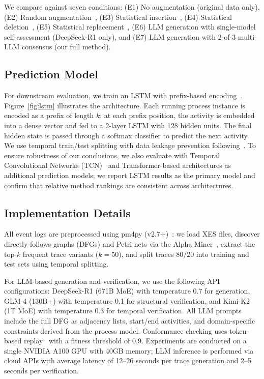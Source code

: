 \documentclass[11pt,a4paper]{article}
\begin{document}
We compare against seven conditions: (E1) No augmentation (original data only), (E2) Random augmentation~\cite{kappel2023modelagnostic}, (E3) Statistical insertion~\cite{vanstraten2025siamsa}, (E4) Statistical deletion~\cite{vanstraten2025siamsa}, (E5) Statistical replacement~\cite{vanstraten2025siamsa}, (E6) LLM generation with single-model self-assessment (DeepSeek-R1 only), and (E7) LLM generation with 2-of-3 multi-LLM consensus (our full method).

\subsection{Prediction Model}

For downstream evaluation, we train an LSTM with prefix-based encoding~\cite{teinemaa2019outcome}. Figure~\ref{fig:lstm} illustrates the architecture. Each running process instance is encoded as a prefix of length $k$; at each prefix position, the activity is embedded into a dense vector and fed to a 2-layer LSTM with 128 hidden units. The final hidden state is passed through a softmax classifier to predict the next activity. We use temporal train/test splitting with data leakage prevention following~\cite{weytjens2024benchmark}. To ensure robustness of our conclusions, we also evaluate with Temporal Convolutional Networks (TCN)~\cite{weytjens2024benchmark} and Transformer-based architectures as additional prediction models; we report LSTM results as the primary model and confirm that relative method rankings are consistent across architectures.

\subsection{Implementation Details}

All event logs are preprocessed using pm4py (v2.7+)~\cite{berti2019pm4py}: we load XES files, discover directly-follows graphs (DFGs) and Petri nets via the Alpha Miner~\cite{vanderaalst2004workflow}, extract the top-$k$ frequent trace variants ($k = 50$), and split traces 80/20 into training and test sets using temporal splitting.

For LLM-based generation and verification, we use the following API configurations: DeepSeek-R1 (671B MoE) with temperature 0.7 for generation, GLM-4 (130B+) with temperature 0.1 for structural verification, and Kimi-K2 (1T MoE) with temperature 0.3 for temporal verification. All LLM prompts include the full DFG as adjacency lists, start/end activities, and domain-specific constraints derived from the process model. Conformance checking uses token-based replay~\cite{vanderaalst2016data} with a fitness threshold of 0.9. Experiments are conducted on a single NVIDIA A100 GPU with 40GB memory; LLM inference is performed via cloud APIs with average latency of 12--26 seconds per trace generation and 2--5 seconds per verification.
\end{document}
